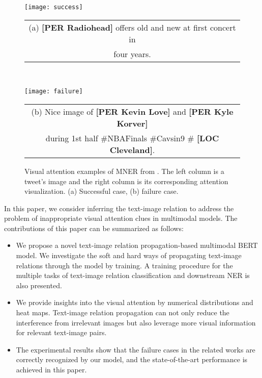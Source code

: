 \documentclass[letterpaper]{article} \usepackage{aaai21}  \usepackage{times}  \usepackage{helvet} \usepackage{courier}  \usepackage[hyphens]{url}  \usepackage{graphicx} \urlstyle{rm} \def\UrlFont{\rm}  \usepackage{natbib}  \usepackage{caption} \frenchspacing  \setlength{\pdfpagewidth}{8.5in}  \setlength{\pdfpageheight}{11in}
\begin{document}
\begin{figure}[tb]
\begin{minipage}[t]{0.5\textwidth}
\centering
\texttt{[image: success]}
\small 
\begin{tabular}{c}
(a) \textbf{[PER Radiohead]} offers old and new at first concert  in \\  four years.
\end{tabular}
\end{minipage}
\\
\begin{minipage}[t]{0.5\textwidth}
\centering
\texttt{[image: failure]}
\small
\begin{tabular}{c}
(b) Nice image of \textbf{[PER Kevin Love]} and \textbf{[PER Kyle Korver]} \\
during 1st half \#NBAFinals \#Cavsin9 \# {\color{red}\textbf{[LOC Cleveland]}.}
\end{tabular}
\end{minipage}
\caption{Visual attention examples of MNER from \cite{lu2018visual}. The left column is a tweet's image and the right column is its corresponding attention visualization.  (a) Successful case, (b) failure case.}\label{fig:visAttExample}
\end{figure}







In this paper, we consider inferring the text-image relation  to address the problem of inappropriate visual attention clues in multimodal models. 
The contributions of this paper can be summarized as follows:
\begin{itemize}
\item 
We propose a novel text-image relation propagation-based multimodal BERT model.
We investigate the soft and hard ways of propagating text-image relations through the model by training.  
A training procedure for the multiple tasks of text-image relation classification and  downstream NER  is also presented.
\item 
We provide insights into the visual attention by numerical distributions and heat maps.
Text-image relation propagation can not only reduce the interference from irrelevant images but also leverage more visual information for relevant text-image pairs.
\item 
The experimental results show that the failure cases in the related works are correctly recognized by our model, and the state-of-the-art performance is achieved in this paper. 


\end{itemize}
\end{document}
